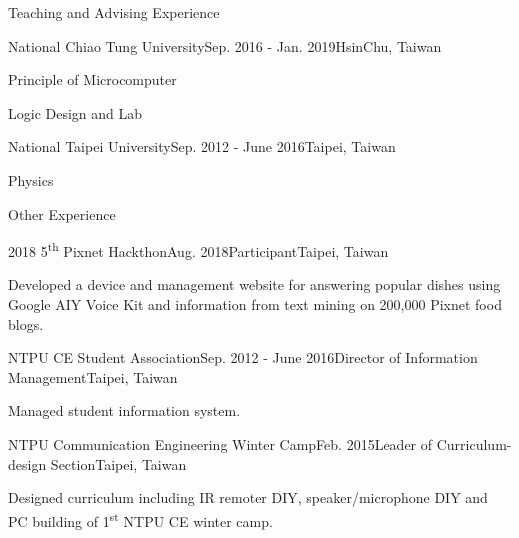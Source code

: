 \documentclass{resume} %
\newcommand{\ts}{\textsuperscript}
\begin{document}
\begin{rSection}{Teaching and Advising Experience}
    \begin{rSubsection}{National Chiao Tung University}{Sep. 2016 - Jan. 2019}{}{HsinChu, Taiwan}
        \item Principle of Microcomputer
        \item Logic Design and Lab
    \end{rSubsection}
    \begin{rSubsection}{National Taipei University}{Sep. 2012 - June 2016}{}{Taipei, Taiwan}
        \item Physics
    \end{rSubsection}
\end{rSection}

\begin{rSection}{Other Experience}
    \begin{rSubsection}{2018 5\ts{th} Pixnet Hackthon}{Aug. 2018}{Participant}{Taipei, Taiwan}
        \item Developed a device and management website for answering popular dishes using Google AIY Voice Kit and information from text mining on 200,000 Pixnet food blogs.
    \end{rSubsection}
    \begin{rSubsection}{NTPU CE Student Association}{Sep. 2012 - June 2016}{Director of Information Management}{Taipei, Taiwan}
        \item Managed student information system.
    \end{rSubsection}
    \begin{rSubsection}{NTPU Communication Engineering Winter Camp}{Feb. 2015}{Leader of Curriculum-design Section}{Taipei, Taiwan}
        \item Designed curriculum including IR remoter DIY, speaker/microphone DIY and PC building of 1\ts{st} NTPU CE winter camp.
    \end{rSubsection}
\end{rSection}
\end{document}
